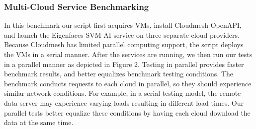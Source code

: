 \begin{table}[htb]
\bigskip

\caption{Test results for the Eigenfaces SVM benchmark deployed
  as a mutli-cloud service.}
\label{tab:3}



\end{table}

\subsubsection{Multi-Cloud Service Benchmarking}
\label{multi-cloud-service-benchmarking}

In this benchmark our script first acquires VMs, install Cloudmesh
OpenAPI, and launch the Eigenfaces SVM AI service on three separate
cloud providers. Because Cloudmesh has limited parallel computing
support, the script deploys the VMs in a serial manner. After the
services are running, we then run our tests in a parallel manner as
depicted in Figure 2. Testing in parallel provides faster benchmark
results, and better equalizes benchmark testing conditions. The
benchmark conducts requests to each cloud in parallel, so they should
experience similar network conditions. For example, in a serial testing
model, the remote data server may experience varying loads resulting in
different load times. Our parallel tests better equalize these
conditions by having each cloud download the data at the same time.

